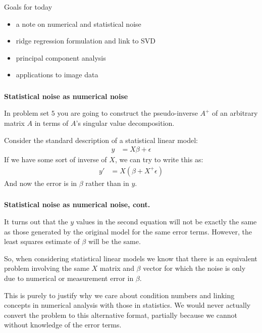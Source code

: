 \begin{frame}[fragile] \frametitle{}

{\color{yaleblue}\fontsize{16pt}{20pt}\selectfont Goals for today}

\begin{itemize}
\item a note on numerical and statistical noise
\item ridge regression formulation and link to SVD
\item principal component analysis
\item applications to image data
\end{itemize}

\end{frame}

\begin{frame}[fragile] \frametitle{}

\textbf{Statistical noise as numerical noise}

In problem set $5$ you are going to construct the pseudo-inverse $A^{+}$
of an arbitrary matrix $A$ in terms of $A$'s singular value decomposition.

\pause Consider the standard description of a statistical linear model:
\begin{align*}
y &= X \beta + \epsilon
\end{align*}
If we have some sort of inverse of $X$, we can try to write this as:
\begin{align*}
y' &= X (\beta + X^{+} \epsilon)
\end{align*}
And now the error is in $\beta$ rather than in $y$.

\end{frame}

\begin{frame}[fragile] \frametitle{}

\textbf{Statistical noise as numerical noise, cont.}

It turns out that the $y$ values in the second equation will not be exactly
the same as those generated by the original model for the same error terms.
However, the least squares estimate of $\beta$ will be the same.

\pause So, when considering statistical linear models we know that there is
an equivalent problem involving the same $X$ matrix and $\beta$ vector for
which the noise is only due to numerical or measurement error in $\beta$.

\pause This is purely to justify why we care about condition numbers and
linking concepts in numerical analysis with those in statistics. We would
never actually convert the problem to this alternative format, partially
because we cannot without knowledge of the error terms.

\end{frame}

